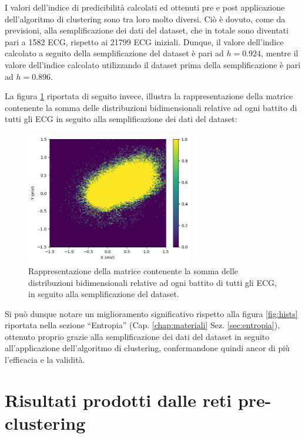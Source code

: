 I valori dell'indice di predicibilità calcolati ed ottenuti pre e post applicazione dell'algoritmo di clustering sono tra loro molto diversi. Ciò è dovuto, come da previsioni, alla semplificazione dei dati del dataset, che in totale sono diventati pari a 1582 ECG, rispetto ai 21799 ECG iniziali. Dunque, il valore dell'indice calcolato a seguito della semplificazione del dataset è pari ad $ h = 0.924 $, mentre il valore dell'indice calcolato utilizzando il dataset prima della semplificazione è pari ad $ h = 0.896 $.

La figura \ref{fig:hists2} riportata di seguito invece, illustra la rappresentazione della matrice contenente la somma delle distribuzioni bidimensionali relative ad ogni battito di tutti gli ECG in seguito alla semplificazione dei dati del dataset:

\begin{figure}[H]
    \centering
    \includegraphics[width=0.65\textwidth]{immagini/hists2.png}
    \captionsetup{justification=centering}
    \caption{Rappresentazione della matrice contenente la somma delle distribuzioni bidimensionali relative ad ogni battito di tutti gli ECG, in seguito alla semplificazione del dataset.}
    \label{fig:hists2}
\end{figure}

Si può dunque notare un miglioramento significativo rispetto alla figura \ref{fig:hists} riportata nella sezione ``Entropia'' (Cap. \ref{chap:materiali} Sez. \ref{sec:entropia}), ottenuto proprio grazie alla semplificazione dei dati del dataset in seguito all'applicazione dell'algoritmo di clustering, confermandone quindi ancor di più l'efficacia e la validità.

\section{Risultati prodotti dalle reti pre-clustering}
\label{sec:network_risultati}

